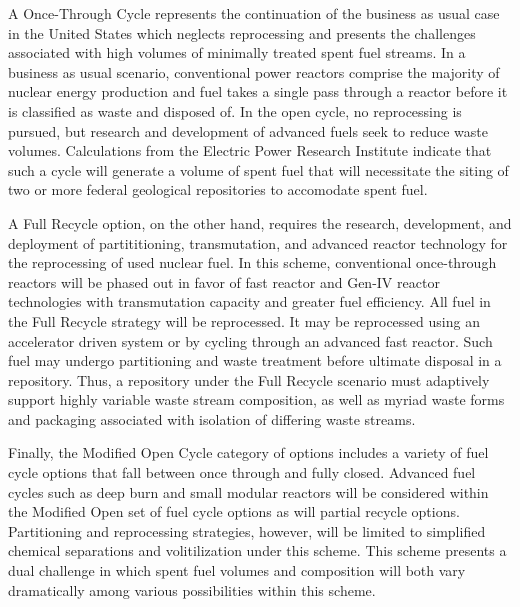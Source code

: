 A Once-Through Cycle represents the continuation of the business as 
usual case in the United States which neglects reprocessing and 
presents the challenges associated with high volumes of minimally 
treated spent fuel streams.  In a business as usual scenario, 
conventional power reactors comprise the majority of nuclear energy 
production and fuel takes a single pass through a reactor before it is 
classified as waste and disposed of. In the open cycle, no 
reprocessing is pursued, but research and development of advanced 
fuels seek to reduce waste volumes. Calculations from the Electric 
Power Research Institute indicate that such a cycle will generate a 
volume of spent fuel that will necessitate the siting of two or more 
federal  geological repositories to accomodate spent fuel.  
\cite{kessler_room_2006}  %

A Full Recycle option, on the other hand, requires the research, 
development, and deployment of partititioning, transmutation, and 
advanced reactor technology for the reprocessing of used nuclear fuel.  
In this scheme, conventional once-through reactors will be phased out 
in favor of fast reactor and Gen-IV reactor technologies with 
transmutation capacity and greater fuel efficiency. All fuel in the 
Full Recycle strategy will be reprocessed. It may be reprocessed using  
an accelerator driven system or by cycling through an advanced fast 
reactor. Such fuel may undergo partitioning and waste treatment before 
ultimate disposal in a repository. Thus, a repository under the Full 
Recycle scenario must adaptively support highly variable waste stream 
composition, as well as myriad waste forms and packaging associated 
with isolation of differing waste streams.

Finally, the Modified Open Cycle category of options includes a 
variety of fuel cycle options that fall between once through and fully 
closed. Advanced fuel cycles such as deep burn and small modular 
reactors will be considered within the Modified Open set of fuel cycle 
options as will partial recycle options. Partitioning and reprocessing 
strategies, however, will be limited to simplified chemical 
separations and volitilization under this scheme. This scheme presents
a dual challenge in which spent fuel volumes and composition will both 
vary dramatically among various possibilities within this scheme.  
\cite{department_of_energy_-_nuclear_energy_nuclear_2010} 

